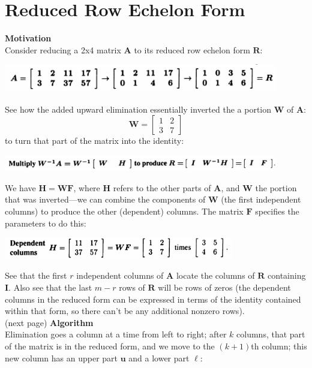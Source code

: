 \documentclass{report}
\begin{document}
\section{Reduced Row Echelon Form}
\textbf{Motivation}\\
Consider reducing a 2x4 matrix $\bm A$ to its reduced row echelon form $\bm R$:
\begin{center}
\includegraphics[width=12cm]{25}
\end{center}
See how the added upward elimination essentially inverted the a portion $\bm W$ of $\bm A$:
\begin{equation*}
\bm W=\left[\begin{array}{cc}1&2\\3&7\end{array}\right]
\end{equation*}
to turn that part of the matrix into the identity:
\begin{center}
\includegraphics[width=12cm]{26}
\end{center}
We have $\bm H=\bm{WF}$, where $\bm H$ refers to the other parts of $\bm A$, and $\bm W$ the portion that was inverted---we can
combine the components of $\bm W$ (the first independent columns) to produce the other (dependent) columns. The matrix $\bm F$ specifies the parameters to do this:
\begin{center}
\includegraphics[width=10cm]{27}
\end{center}
See that the first $r$ independent columns of $\bm A$ locate the columns of $\bm R$ containing $\bm I$.
Also see that the last $m-r$ rows of $\bm R$ will be rows
of zeros (the dependent columns in the reduced form can be expressed in terms of the identity contained within that form, so there can't be any additional nonzero 
rows).\\
(next page)\newpage
\noindent\textbf{Algorithm}\\
Elimination goes a column at a time from left to right; after $k$ columns, that part of the matrix is in the reduced form, and we move to the $(k+1)$th column;
this new column has an upper part $\bm u$ and a lower part $\bm\ell$:
\end{document}
